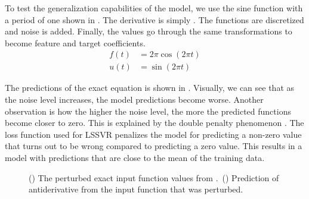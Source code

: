 \documentclass[preprint,12pt,times,authoryear]{elsarticle}
\begin{document}
To test the generalization capabilities of the model, we use the sine function with a period of one shown in . The derivative is simply . The functions are discretized and noise is added. Finally, the values go through the same transformations to become feature and target coefficients.
\begin{align}
  f(t) & = 2\pi \cos\left(2\pi t\right)\label{eq:sine_derivative} \\
  u(t) & = \sin\left(2\pi t\right)\label{eq:sine_function}
\end{align}

The predictions of the exact equation is shown in . Visually, we can see that as the noise level increases, the model predictions become worse. Another observation is how the higher the noise level, the more the predicted functions become closer to zero. This is explained by the double penalty phenomenon \citep{lledoScaledependentVerificationPrecipitation2023}. The loss function used for LSSVR penalizes the model for predicting a non-zero value that turns out to be wrong compared to predicting a zero value. This results in a model with predictions that are close to the mean of the training data.
\begin{figure}[H]
  \centering
  \begin{subfigure}{\linewidth}
    \begin{adjustbox}{width=\linewidth}
      
    \end{adjustbox}
    \caption{}\label{fig:antiderivative_exact_input}
  \end{subfigure}
  \begin{subfigure}{\linewidth}
    \begin{adjustbox}{width=\linewidth}
      
    \end{adjustbox}
    \caption{}\label{fig:antiderivative_exact_prediction}
  \end{subfigure}
  \caption{() The perturbed exact input function values from .\ () Prediction of antiderivative from the input function that was perturbed.}\label{fig:antiderivative_exact}
\end{figure}
\end{document}
